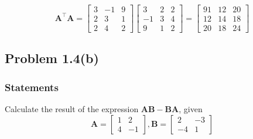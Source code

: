 \documentclass{article}
\begin{document}
                \begin{equation*}
                    \mathbf{{A}^\intercal A} =
                    \begin{bmatrix}3 & -1 & 9 \\ 2 & 3 & 1 \\ 2 & 4 & 2\end{bmatrix}
                    \begin{bmatrix}3 & 2 & 2 \\ -1 & 3 & 4 \\ 9 & 1 & 2\end{bmatrix}
                    =
                    \begin{bmatrix}91 & 12 & 20 \\ 12 & 14 & 18 \\ 20 & 18 & 24\end{bmatrix}
                \end{equation*}

        \subsection{Problem 1.4(b)}
            \subsubsection{Statements}
                Calculate the result of the expression $\mathbf{AB - BA}$, given
                \begin{equation*}
                    \mathbf{A} = \begin{bmatrix}1 & 2 \\ 4 & -1\end{bmatrix}
                    ,
                    \mathbf{B} = \begin{bmatrix}2 & -3 \\ -4 & 1\end{bmatrix}
                \end{equation*}
\end{document}
